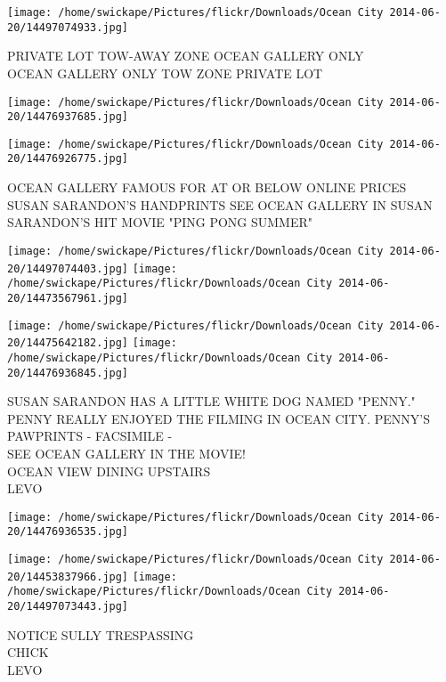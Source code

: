 \documentclass[10pt,letterpaper]{article}
\begin{document}
\vspace{0.25in}
\texttt{[image: /home/swickape/Pictures/flickr/Downloads/Ocean City 2014-06-20/14497074933.jpg]}

PRIVATE LOT TOW{-}AWAY ZONE OCEAN GALLERY ONLY\\
OCEAN GALLERY ONLY TOW ZONE PRIVATE LOT\\
\pagebreak

\texttt{[image: /home/swickape/Pictures/flickr/Downloads/Ocean City 2014-06-20/14476937685.jpg]}

\vspace{0.25in}
\texttt{[image: /home/swickape/Pictures/flickr/Downloads/Ocean City 2014-06-20/14476926775.jpg]}

OCEAN GALLERY FAMOUS FOR AT OR BELOW ONLINE PRICES\\
SUSAN SARANDON'S HANDPRINTS SEE OCEAN GALLERY IN SUSAN SARANDON'S HIT MOVIE "PING PONG SUMMER"\\
\pagebreak

\texttt{[image: /home/swickape/Pictures/flickr/Downloads/Ocean City 2014-06-20/14497074403.jpg]}
\texttt{[image: /home/swickape/Pictures/flickr/Downloads/Ocean City 2014-06-20/14473567961.jpg]}

\texttt{[image: /home/swickape/Pictures/flickr/Downloads/Ocean City 2014-06-20/14475642182.jpg]}
\texttt{[image: /home/swickape/Pictures/flickr/Downloads/Ocean City 2014-06-20/14476936845.jpg]}

SUSAN SARANDON HAS A LITTLE WHITE DOG NAMED "PENNY."  PENNY REALLY ENJOYED THE FILMING IN OCEAN CITY.  PENNY'S PAWPRINTS {-} FACSIMILE {-}\\
SEE OCEAN GALLERY IN THE MOVIE!\\
OCEAN VIEW DINING UPSTAIRS\\
LEVO\\
\pagebreak

\texttt{[image: /home/swickape/Pictures/flickr/Downloads/Ocean City 2014-06-20/14476936535.jpg]}

\vspace{0.25in}
\texttt{[image: /home/swickape/Pictures/flickr/Downloads/Ocean City 2014-06-20/14453837966.jpg]}
\texttt{[image: /home/swickape/Pictures/flickr/Downloads/Ocean City 2014-06-20/14497073443.jpg]}

NOTICE SULLY TRESPASSING\\
CHICK\\
LEVO\\
\pagebreak
\end{document}
